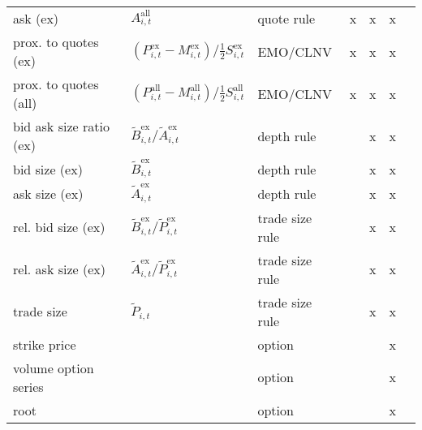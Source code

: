 \begin{ThreePartTable}
\begin{longtable}{@{}lllllll@{}}
            ask (ex)                & $A_{i, t}^{\text{all}}$                                                                          & quote rule           & x & x & x          \\
            prox. to quotes (ex)    & $\left(P_{i, t}^{\text{ex}}- M_{i, t}^{\text{ex}}\right) / \tfrac{1}{2} S_{i, t}^{\text{ex}}$    & \gls{EMO}/\gls{CLNV} & x & x & x         \\
            prox. to quotes (all)   & $\left(P_{i, t}^{\text{all}}- M_{i, t}^{\text{all}}\right) / \tfrac{1}{2} S_{i, t}^{\text{all}}$ & \gls{EMO}/\gls{CLNV} & x & x & x          \\
            bid ask size ratio (ex) & $\tilde{B}_{i, t}^{\text{ex}}/\tilde{A}_{i, t}^{\text{ex}}$                                      & depth rule           &  & x & x          \\
            bid size (ex)           & $\tilde{B}_{i, t}^{\text{ex}}$                                                                   & depth rule           &  & x & x          \\
            ask size (ex)           & $\tilde{A}_{i, t}^{\text{ex}}$                                                                   & depth rule           &  & x & x          \\
            rel. bid size (ex)      & $\tilde{B}_{i, t}^{\text{ex}}/\tilde{P}_{i, t}^{\text{ex}}$                                      & trade size rule      &  & x & x          \\
            rel. ask size (ex)      & $\tilde{A}_{i, t}^{\text{ex}}/\tilde{P}_{i, t}^{\text{ex}}$                                      & trade size rule      &  & x & x          \\
            trade size              & $\tilde{P}_{i, t}$                                                                               & trade size rule      &  & x & x          \\
            strike price            &                                                                                                  & option               &  &  & x            \\
            volume option series    &                                                                                                  & option               & &  & x           \\
            root                    &                                                                                                  & option               & &  & x           \\

\end{longtable}
\end{ThreePartTable}
